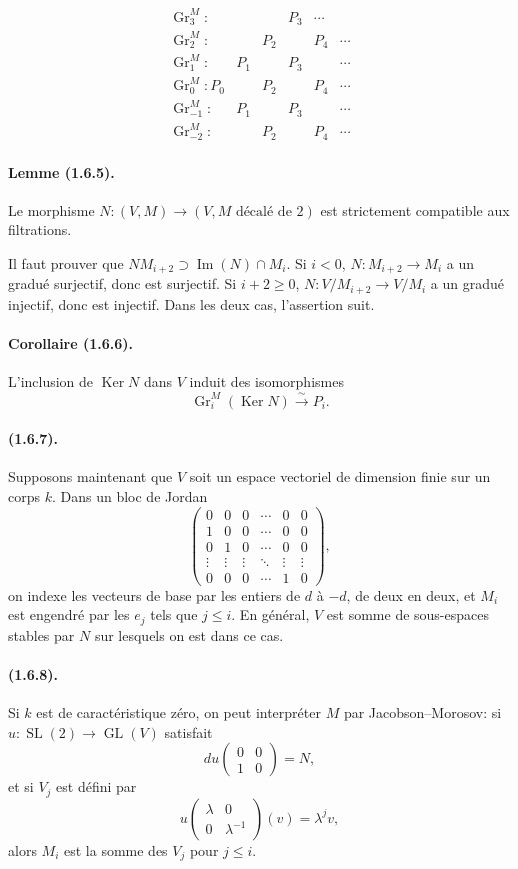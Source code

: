 \documentclass[11pt]{article}
\theoremstyle{remark}
\newcommand{\Gr}{\operatorname{Gr}}
\newcommand{\GL}{\operatorname{GL}}
\newcommand{\Ker}{\operatorname{Ker}}
\newcommand{\Image}{\operatorname{Im}}
\begin{document}
\[
\begin{array}{cccccc}
\Gr^M_3: &&& P_3&\cdots\\
\Gr^M_2: && P_2 &&P_4&\cdots\\
\Gr^M_1: &P_1&&P_3&&\cdots\\
\Gr^M_0:P_0&&P_2&&P_4&\cdots\\
\Gr^M_{-1}:&P_1&&P_3&&\cdots\\
\Gr^M_{-2}:&&P_2&&P_4&\cdots
\end{array}
\]

\paragraph{Lemme (1.6.5).}
Le morphisme $N:(V,M)\to(V,M\text{ décalé de }2)$ est strictement compatible aux filtrations.

Il faut prouver que $NM_{i+2}\supset\Image(N)\cap M_i$. Si $i<0$, $N:M_{i+2}\to M_i$ a un gradué surjectif, donc est surjectif. Si $i+2\ge0$, $N:V/M_{i+2}\to V/M_i$ a un gradué injectif, donc est injectif. Dans les deux cas, l'assertion suit.

\paragraph{Corollaire (1.6.6).}
L'inclusion de $\Ker N$ dans $V$ induit des isomorphismes
\[
\Gr^M_i(\Ker N)\xrightarrow{\sim}P_i.
\]

\paragraph{(1.6.7).}
Supposons maintenant que $V$ soit un espace vectoriel de dimension finie sur un corps $k$. Dans un bloc de Jordan
\begin{equation}\tag{1.6.7.1}
\begin{pmatrix}
0&0&0&\cdots&0&0\\
1&0&0&\cdots&0&0\\
0&1&0&\cdots&0&0\\
\vdots&\vdots&\vdots&\ddots&\vdots&\vdots\\
0&0&0&\cdots&1&0
\end{pmatrix},
\end{equation}
on indexe les vecteurs de base par les entiers de $d$ à $-d$, de deux en deux, et $M_i$ est engendré par les $e_j$ tels que $j\le i$. En général, $V$ est somme de sous-espaces stables par $N$ sur lesquels on est dans ce cas.

\paragraph{(1.6.8).}
Si $k$ est de caractéristique zéro, on peut interpréter $M$ par Jacobson--Morosov: si $u:\operatorname{SL}(2)\to\GL(V)$ satisfait
\[
du\begin{pmatrix}0&0\\1&0\end{pmatrix}=N,
\]
et si $V_j$ est défini par
\[
u\begin{pmatrix}\lambda&0\\0&\lambda^{-1}\end{pmatrix}(v)=\lambda^jv,
\]
alors $M_i$ est la somme des $V_j$ pour $j\le i$.
\end{document}
